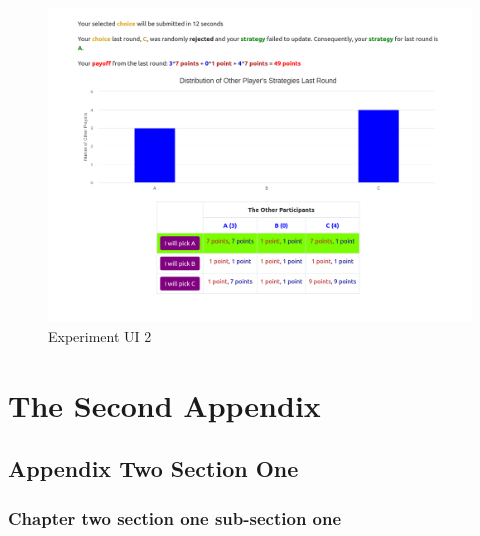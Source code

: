 \begin{figure}[h]
\captionsetup{justification=centering}
  \caption{Experiment UI 2}
   \label{fig:UI2}
    \includegraphics[width = \textwidth]{Images/Game1Reject.png}
\end{figure}


\setcounter{figure}{0}
\setcounter{table}{0}
\chapter{The Second Appendix}
\section{Appendix Two Section One}
\subsection{Chapter two section one sub-section one}

